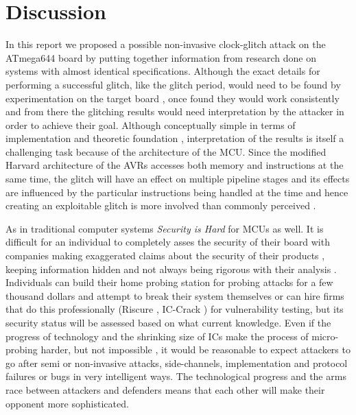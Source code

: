 \section{Discussion}
\label{sec:conclusion}
In this report we proposed a possible non-invasive clock-glitch attack on the ATmega644 board by putting together information from research done on systems with almost identical specifications. Although the exact details for performing a successful glitch, like the glitch period, would need to be found by experimentation on the target board \citep{glitches_paper}, once found they would work consistently \citep{glitches_paper} and from there the glitching results would need interpretation by the attacker in order to achieve their goal. Although conceptually simple in terms of implementation and theoretic foundation \citep{sergei:thesis} \citep{glitches_paper}, interpretation of the results is itself a challenging task \citep{glitches_paper} because of the architecture of the MCU. Since the modified Harvard architecture of the AVRs accesses both memory and instructions at the same time, the glitch will have an effect on multiple pipeline stages and its effects are influenced by the particular instructions being handled at the time and hence creating an exploitable glitch is more involved than commonly perceived \citep{glitches_paper}. 

As in traditional computer systems \emph{Security is Hard} for MCUs as well. It is difficult for an individual to completely asses the security of their board with companies making exaggerated claims about the security of their products \citep{sergei:thesis}, keeping information hidden and not always being rigorous with their analysis \citep{sergei:thesis}. Individuals can build their home probing station for probing attacks for a few thousand dollars \citep{sergei:thesis} \citep{low_cost_probing} and attempt to break their system themselves or can hire firms that do this professionally (Riscure \citep{website:riscure}, {IC-Crack} \citep{atmel_mcu_crack}) for vulnerability testing, but its security status will be assessed based on what current knowledge. Even if the progress of technology and the shrinking size of ICs make the process of micro-probing harder, but not impossible \citep{sergei:thesis} \citep{gutman:memory_remanence}, it would be reasonable to expect attackers to go after semi or non-invasive attacks, side-channels, implementation and protocol failures or bugs in very intelligent ways. The technological progress and the arms race between attackers and defenders means that each other will make their opponent more sophisticated.

